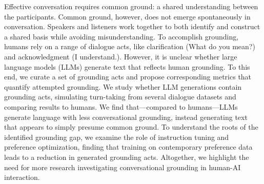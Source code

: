 Effective conversation requires common ground: a shared understanding between the participants. Common ground, however, does not emerge spontaneously in conversation. Speakers and listeners work together to both identify and construct a shared basis while avoiding misunderstanding. To accomplish grounding, humans rely on a range of dialogue acts, like clarification (What do you mean?) and acknowledgment (I understand.). However, it is unclear whether large language models (LLMs) generate text that reflects human grounding. To this end, we curate a set of grounding acts and propose corresponding metrics that quantify attempted grounding. We study whether LLM generations contain grounding acts, simulating turn-taking from several dialogue datasets and comparing results to humans. We find that---compared to humans---LLMs generate language with less conversational grounding, instead generating text that appears to simply presume common ground. To understand the roots of the identified grounding gap, we examine the role of instruction tuning and preference optimization, finding that training on contemporary preference data leads to a reduction in generated grounding acts. Altogether, we highlight the need for more research investigating conversational grounding in human-AI interaction.